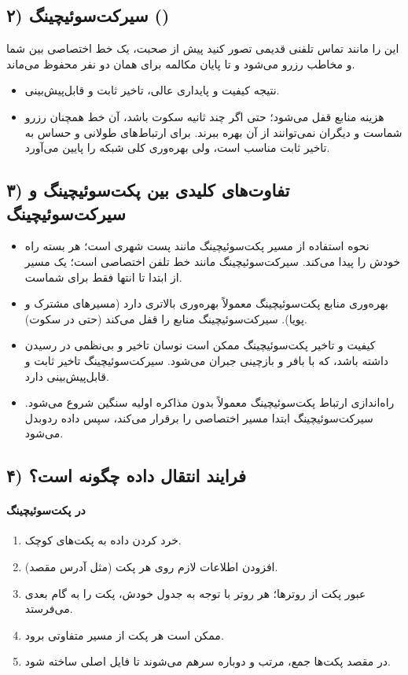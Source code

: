 \subsection*{۲) سیرکت‌سوئیچینگ ()}
این را مانند تماس تلفنی قدیمی تصور کنید پیش از صحبت، یک خط اختصاصی بین شما و مخاطب رزرو می‌شود و تا پایان مکالمه برای همان دو نفر محفوظ می‌ماند.
\begin{itemize}
  \item نتیجه کیفیت و پایداری عالی، تاخیر ثابت و قابل‌پیش‌بینی.
  \item هزینه منابع قفل می‌شود؛ حتی اگر چند ثانیه سکوت باشد، آن خط همچنان رزرو شماست و دیگران نمی‌توانند از آن بهره ببرند. برای ارتباط‌های طولانی و حساس به تاخیر ثابت مناسب است، ولی بهره‌وری کلی شبکه را پایین می‌آورد.
\end{itemize}

\subsection*{۳) تفاوت‌های کلیدی بین پکت‌سوئیچینگ و سیرکت‌سوئیچینگ}
\begin{itemize}
  \item نحوه استفاده از مسیر پکت‌سوئیچینگ مانند پست شهری است؛ هر بسته راه خودش را پیدا می‌کند. سیرکت‌سوئیچینگ مانند خط تلفن اختصاصی است؛ یک مسیر از ابتدا تا انتها فقط برای شماست.
  \item بهره‌وری منابع پکت‌سوئیچینگ معمولاً بهره‌وری بالاتری دارد (مسیرهای مشترک و پویا). سیرکت‌سوئیچینگ منابع را قفل می‌کند (حتی در سکوت).
  \item کیفیت و تاخیر پکت‌سوئیچینگ ممکن است نوسان تاخیر و بی‌نظمی در رسیدن داشته باشد، که با بافر و بازچینی جبران می‌شود. سیرکت‌سوئیچینگ تاخیر ثابت و قابل‌پیش‌بینی دارد.
  \item راه‌اندازی ارتباط پکت‌سوئیچینگ معمولاً بدون مذاکره اولیه سنگین شروع می‌شود. سیرکت‌سوئیچینگ ابتدا مسیر اختصاصی را برقرار می‌کند، سپس داده ردوبدل می‌شود.
\end{itemize}

\subsection*{۴) فرایند انتقال داده چگونه است؟}

\paragraph{در پکت‌سوئیچینگ}
\begin{enumerate}
  \item خرد کردن داده به پکت‌های کوچک.
  \item افزودن اطلاعات لازم روی هر پکت (مثل آدرس مقصد).
  \item عبور پکت از روترها؛ هر روتر با توجه به جدول خودش، پکت را به گام بعدی می‌فرستد.
  \item ممکن است هر پکت از مسیر متفاوتی برود.
  \item در مقصد پکت‌ها جمع، مرتب و دوباره سرهم می‌شوند تا فایل اصلی ساخته شود.
\end{enumerate}

